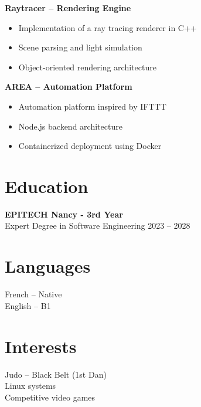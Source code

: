 \documentclass[11pt,a4paper]{article}
\begin{document}
\textbf{Raytracer -- Rendering Engine}

\begin{itemize}
\item Implementation of a ray tracing renderer in C++
\item Scene parsing and light simulation
\item Object-oriented rendering architecture
\end{itemize}

\textbf{AREA -- Automation Platform}

\begin{itemize}
\item Automation platform inspired by IFTTT
\item Node.js backend architecture
\item Containerized deployment using Docker
\end{itemize}

\section*{Education}

\textbf{EPITECH Nancy - 3rd Year} \\
Expert Degree in Software Engineering \hfill 2023 -- 2028

\begin{minipage}[t]{0.48\textwidth}

\section*{Languages}

French -- Native \\
English -- B1

\end{minipage}
\hfill
\begin{minipage}[t]{0.48\textwidth}

\section*{Interests}

Judo -- Black Belt (1st Dan) \\
Linux systems \\
Competitive video games

\end{minipage}
\end{document}
